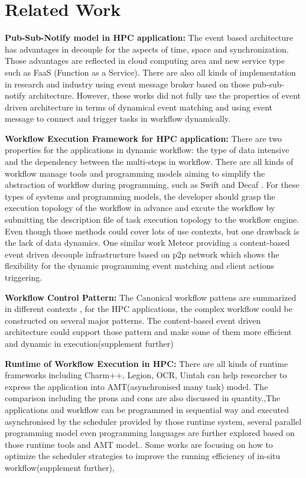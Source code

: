 \section{Related Work}

\textbf{Pub-Sub-Notify model in HPC application:}
The event based architecture has advantages in decouple for the aspects of time, space and synchronization\cite{eugster2003many}. Those advantages are reflected in cloud computing area and new service type such as FaaS (Function as a Service)\cite{fox2017status}. There are also all kinds of implementation in research and industry using event message broker based on those pub-sub-notify architecture\cite{hivemq,jin2012scalable}. However, these works did not fully use the properties of event driven architecture in terms of dynamical event matching and using event message to connect and trigger tasks in workflow dynamically. 


\textbf{Workflow Execution Framework for HPC application:}
There are two properties for the applications in dynamic workflow: the type of data intensive and the dependency between the multi-steps in workflow. There are all kinds of workflow manage tools and programming models aiming to simplify the abstraction of workflow during programming, such as Swift\cite{wilde2011swift} and Decaf \cite{dreher2017decaf} . For these types of systems and programming models, the developer should grasp the execution topology of the workflow in advance and excute the workflow by submitting the description file of task execution topology to the workflow engine. Even though those methods could cover lots of use contexts, but one drawback is the lack of data dynamics. One similar work Meteor\cite{jiang2008meteor} providing a content-based event driven decouple infrastructure based on p2p network which shows the flexibility for the dynamic programming event matching and client actions triggering. 

\textbf{Workflow Control Pattern:}
The Canonical workflow pattens are summarized in different contexts\cite{russell2006workflow} , for the HPC applications, the complex workflow could be constructed on several major patterns\cite{bharathi2008characterization}. The content-based event driven architecture could support those pattern and make some of them more efficient and dynamic in execution(supplement further)

\textbf{Runtime of Workflow Execution in HPC:}
There are all kinds of runtime frameworks including Charm++, Legion, OCR, Uintah can help researcher to express the application into AMT(asynchronised many task) model. The comparison including the prons and cons are also discussed in quantity.\cite{wilke2015asynchronousa,wilke2015asynchronousb},The applications and workflow can be programmed in sequential way and executed asynchronised by the scheduler provided by those runtime system, several parallel programming model even programming languages are further explored based on those runtime tools and AMT model.\cite{pebay2016towards,acun2014parallel,insituvisual}. Some works \cite{sun2016staging} are focusing on how to optimize the scheduler strategies to improve the running efficiency of in-situ workflow(supplement further), 
